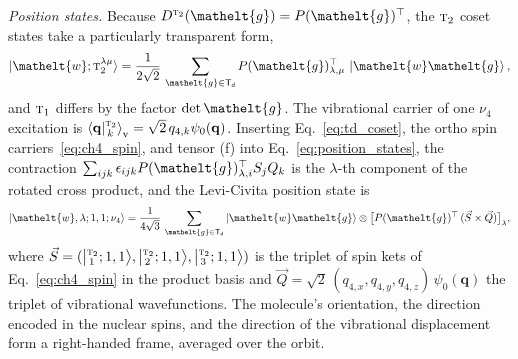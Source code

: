 \documentclass[
  reprint,
  aps,
  prx,
  superscriptaddress,
  amsmath,
  amssymb,
  longbibliography
]{revtex4-2}
\newcommand{\eltfont}[1]{{\let\sigma\eltsigma\mathelt{#1}}}
\newcommand{\grp}[1]{\mathsf{#1}}
\newcommand{\irr}[1]{\text{\normalfont\scshape #1}}
\newcommand{\elt}[1]{\eltfont{#1}}
\newcommand{\cgket}[3]{\bigl\lvert{}^{#1}_{\,#2};#3\bigr\rangle}
\newcommand{\gel}{\elt{g}}             %
\newcommand{\crep}{\elt{w}}           %
\newcommand{\gmat}{P(\gel)^{\top}}     %
\begin{document}
\emph{Position states.} Because $D^{\irr{t}_{2}}(\gel)=\gmat$, the $\irr{t}_{2}$ coset states take a particularly transparent form,
\begin{equation}
\ket{\crep;\irr{t}_{2}^{\lambda\mu}}=\frac{1}{2\sqrt{2}}\,\sum_{\gel\in \grp{T_{d}}}\gmat_{\lambda,\mu}\,\ket{\crep\gel},
\label{eq:td_coset}
\end{equation}
and $\irr{t}_{1}$ differs by the factor $\det \gel$. The vibrational carrier of one $\nu_4$ excitation is $\braket{\mathbf q|{}^{\irr{t}_{2}}_{\,k}}_{\mathrm{v}}=\sqrt2\,q_{4,k}\psi_0(\mathbf q)$. Inserting Eq.~\eqref{eq:td_coset}, the ortho spin carriers~\eqref{eq:ch4_spin}, and tensor (f) into Eq.~\eqref{eq:position_states}, the contraction $\sum_{ijk}\epsilon_{ijk}\gmat_{\lambda,i}S_jQ_k$ is the $\lambda$-th component of the rotated cross product, and the Levi-Civita position state is
\begin{equation}
\ket{\crep,\lambda;1,1;\nu_4}=\frac{1}{4\sqrt{3}}\,\sum_{\gel\in \grp{T_{d}}}\ket{\crep\gel}\otimes\bigl[\gmat\,(\vec S\times\vec Q)\bigr]_\lambda ,
\label{eq:ch4_position}
\end{equation}
where $\vec S=(\cgket{\irr{t}_{2}}{1}{1,1},\cgket{\irr{t}_{2}}{2}{1,1},\cgket{\irr{t}_{2}}{3}{1,1})$ is the triplet of spin kets of Eq.~\eqref{eq:ch4_spin} in the product basis and $\vec Q=\sqrt2\,(q_{4,x},q_{4,y},q_{4,z})\,\psi_0(\mathbf q)$ the triplet of vibrational wavefunctions. The molecule's orientation, the direction encoded in the nuclear spins, and the direction of the vibrational displacement form a right-handed frame, averaged over the orbit.
\end{document}

